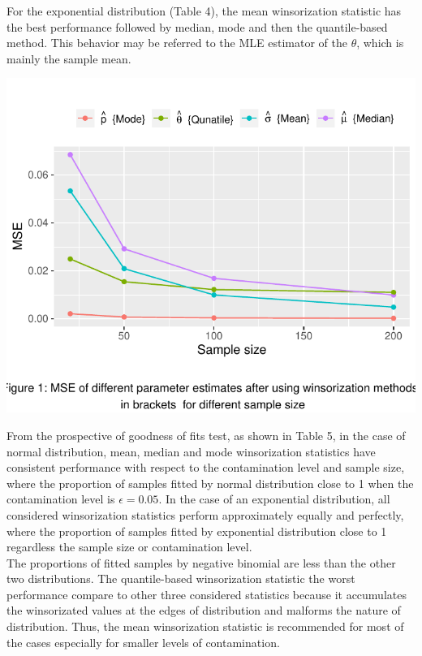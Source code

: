 \documentclass[
]{article}
\begin{document}
For the exponential distribution (Table 4), the mean winsorization
statistic has the best performance followed by median, mode and then the
quantile-based method. This behavior may be referred to the MLE
estimator of the \(\theta\), which is mainly the sample mean.

\begin{CodeChunk}


\begin{center}\includegraphics{new_header_format_files/figure-latex/unnamed-chunk-3-1} \end{center}

\end{CodeChunk}

From the prospective of goodness of fits test, as shown in Table 5, in
the case of normal distribution, mean, median and mode winsorization
statistics have consistent performance with respect to the contamination
level and sample size, where the proportion of samples fitted by normal
distribution close to 1 when the contamination level is
\(\epsilon=0.05\). In the case of an exponential distribution, all
considered winsorization statistics perform approximately equally and
perfectly, where the proportion of samples fitted by exponential
distribution close to 1 regardless the sample size or contamination
level.\\
The proportions of fitted samples by negative binomial are less than the
other two distributions. The quantile-based winsorization statistic the
worst performance compare to other three considered statistics because
it accumulates the winsorizated values at the edges of distribution and
malforms the nature of distribution. Thus, the mean winsorization
statistic is recommended for most of the cases especially for smaller
levels of contamination.
\end{document}
